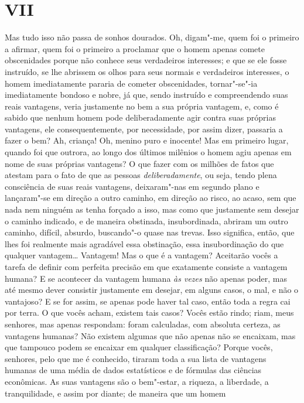 \section{VII}

Mas tudo isso não passa de sonhos dourados. Oh, digam"-me, quem foi o
primeiro a afirmar, quem foi o primeiro a proclamar que o homem apenas
comete obscenidades porque não conhece seus verdadeiros interesses; e
que se ele fosse instruído, se lhe abrissem os olhos para seus normais
e verdadeiros interesses, o homem imediatamente pararia de cometer
obscenidades, tornar"-se"-ia imediatamente bondoso e nobre, já que, sendo
instruído e compreendendo suas reais vantagens, veria justamente no bem
a sua própria vantagem, e, como é sabido que nenhum homem pode
deliberadamente agir contra suas próprias vantagens, ele
consequentemente, por necessidade, por assim dizer, passaria a fazer o
bem? Ah, criança! Oh, menino puro e inocente! Mas em primeiro lugar,
quando foi que outrora, ao longo dos últimos milênios o homem agiu
apenas em nome de suas próprias vantagens? O que fazer com os milhões
de fatos que atestam para o fato de que as pessoas
\textit{deliberadamente}, ou seja, tendo plena consciência de suas
reais vantagens, deixaram"-nas em segundo plano e lançaram"-se em direção
a outro caminho, em direção ao risco, ao acaso, sem que nada nem
ninguém as tenha forçado a isso, mas como que justamente sem desejar o
caminho indicado, e de maneira obstinada, insubordinada, abriram um
outro caminho, difícil, absurdo, buscando"-o quase nas trevas. Isso
significa, então, que lhes foi realmente mais agradável essa
obstinação, essa insubordinação do que qualquer vantagem\ldots{} Vantagem!
Mas o que é a vantagem? Aceitarão vocês a tarefa de definir com
perfeita precisão em que exatamente consiste a vantagem humana? E se
acontecer da vantagem humana \textit{às vezes} não
apenas poder, mas até mesmo dever consistir justamente em desejar, em
alguns casos, o mal, e não o vantajoso? E se for assim, se apenas pode
haver tal caso, então toda a regra cai por terra. O que vocês acham,
existem tais casos? Vocês estão rindo; riam, meus senhores, mas apenas
respondam: foram calculadas, com absoluta certeza, as vantagens
humanas? Não existem algumas que não apenas não se encaixam, mas que
tampouco podem se encaixar em qualquer classificação? Porque vocês,
senhores, pelo que me é conhecido, tiraram toda a sua lista de
vantagens humanas de uma média de dados estatísticos e de fórmulas das
ciências econômicas. As suas vantagens são o bem"-estar, a riqueza, a
liberdade, a tranquilidade, e assim por diante; de maneira que um homem
